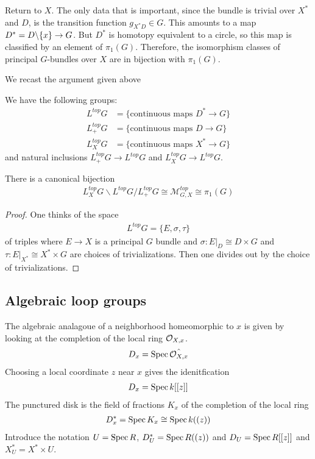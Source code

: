 \documentclass[12pt]{article}
\begin{document}
Return to $X$. The only data that is important, since the bundle is trivial over $X^*$ and $D$, is the transition function $g_{X^*D} \in G$. This amounts to a map $D^* = D \backslash \{x\} \to G$. But $D^*$ is homotopy equivalent to a circle, so this map is classified by an element of $\pi_1(G)$. Therefore, the isomorphism classes of principal $G$-bundles over $X$ are in bijection with $\pi_1(G)$.

We recast the argument given above
\begin{definition}
    We have the following groups: \begin{align*}
        L^{top}G   & = \{ \text{continuous maps } D^* \to G \} \\
        L^{top}_+G & = \{ \text{continuous maps } D \to G \}   \\
        L^{top}_XG & = \{ \text{continuous maps } X^* \to G \}
    \end{align*} and natural inclusions $L^{top}_+G \to L^{top}G$ and $L^{top}_XG \to L^{top}G$.
\end{definition}
\begin{proposition}
    There is a canonical bijection \begin{align*}
        L^{top}_XG \backslash L^{top}G / L^{top}_+G \cong \mathcal{M}^{top}_{G,X} \cong \pi_1(G)
    \end{align*}
\end{proposition}

\begin{proof}
    One thinks of the space \begin{align*}
        L^{top}G = \{ E,\sigma,\tau \}
    \end{align*} of triples where $E \to X$ is a principal $G$ bundle and $\sigma:E\vert_D \cong D\times G$ and $\tau:E\vert_{X^*} \cong X^* \times G$ are choices of trivializations. Then one divides out by the choice of trivializations.
\end{proof}

\subsection{Algebraic loop groups}
The algebraic analagoue of a neighborhood homeomorphic to $x$ is given by looking at the completion of the local ring ${\mathcal{O}}_{X,x}$. \begin{align*}
    D_x = \operatorname{Spec} \hat{{\mathcal{O}}_{X,x}}
\end{align*} Choosing a local coordinate $z$ near $x$ gives the idenitfication \begin{align*}
    D_x = \operatorname{Spec} k[[z]]
\end{align*} The punctured disk is the field of fractions $K_x$ of the completion of the local ring \begin{align*}
    D_x^* = \operatorname{Spec} K_x \cong \operatorname{Spec} k((z))
\end{align*}
Introduce the notation $U = \operatorname{Spec} R$, $D_U^* = \operatorname{Spec} R((z))$ and $D_U = \operatorname{Spec} R[[z]]$ and $X^*_U = X^*\times U$.
\end{document}
